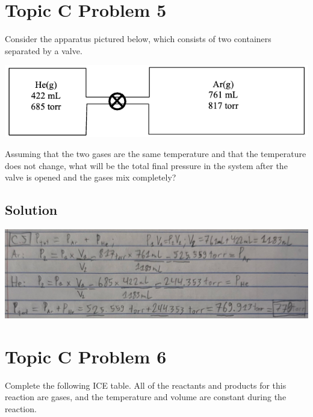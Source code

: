 \documentclass[10pt]{article}
\begin{document}
    \pagebreak
    \section{Topic C Problem 5}
        Consider the apparatus pictured below, which consists of two containers separated by a valve.
        \begin{center}
            \includegraphics{picture_C-5.png}
        \end{center}
        Assuming that the two gases are the same temperature and that the temperature does not change, what will be the total final pressure in the system after the valve is opened and the gases mix completely?

        \subsection{Solution}
            \begin{center}
                \includegraphics[width=\textwidth]{Answers Images/answer_C_5.jpg}
            \end{center}

    \pagebreak
    \section{Topic C Problem 6}
        Complete the following ICE table. 
        All of the reactants and products for this reaction are gases, and the temperature and volume are constant during the reaction.
\end{document}
